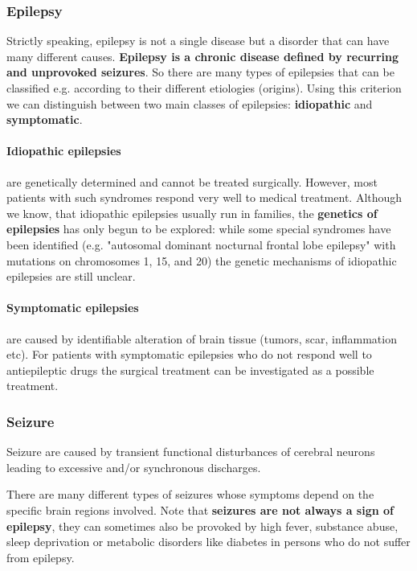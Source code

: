 \documentclass[12pt,article,oneside,a4paper]{memoir}
\begin{document}
\subsubsection{Epilepsy}
Strictly speaking, epilepsy is not a single disease but a disorder that can have many different causes. \textbf{Epilepsy is a chronic disease defined by recurring and unprovoked seizures}.
So there are many types of epilepsies that can be classified e.g. according to their different etiologies (origins). Using this criterion we can distinguish between two main classes of epilepsies: \textbf{idiopathic} and \textbf{symptomatic}.

\paragraph{Idiopathic epilepsies} are genetically determined and cannot be treated surgically. However, most patients with such syndromes respond very well to medical treatment. Although we know, that idiopathic epilepsies usually run in families, the \textbf{genetics of epilepsies} has only begun to be explored: while some special syndromes have been identified (e.g. "autosomal dominant nocturnal frontal lobe epilepsy" with mutations on chromosomes 1, 15, and 20) the genetic mechanisms of idiopathic epilepsies are still unclear.

\paragraph{Symptomatic epilepsies} are caused by identifiable alteration of brain tissue (tumors, scar, inflammation etc). For patients with symptomatic epilepsies who do not respond well to antiepileptic drugs the surgical treatment can be investigated as a possible treatment.

\subsubsection{Seizure}
Seizure are caused by transient functional disturbances of cerebral neurons leading to excessive and/or synchronous discharges.

There are many different types of seizures whose symptoms depend on the specific brain regions involved. 
Note that \textbf{seizures are not always a sign of epilepsy}, they can sometimes also be provoked by high fever, substance abuse, sleep deprivation or metabolic disorders like diabetes in persons who do not suffer from epilepsy.
\end{document}
